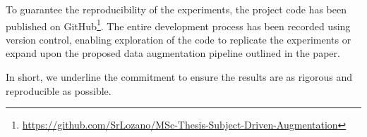 To guarantee the reproducibility of the experiments, the project code has been published on GitHub\footnote{\href{https://github.com/SrLozano/MSc-Thesis-Subject-Driven-Augmentation}{https://github.com/SrLozano/MSc-Thesis-Subject-Driven-Augmentation}}. The entire development process has been recorded using version control, enabling exploration of the code to replicate the experiments or expand upon the proposed data augmentation pipeline outlined in the paper.

In short, we underline the commitment to ensure the results are as rigorous and reproducible as possible.